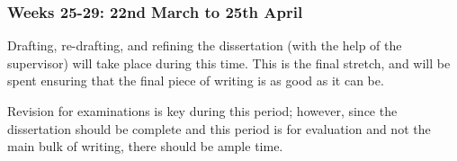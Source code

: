 \documentclass[12pt, a4paper]{scrartcl}
\begin{document}
\subsubsection{Weeks 25-29: 22nd March to 25th April}

Drafting, re-drafting, and refining the dissertation (with the help of the supervisor) will take place during this time. This is the final stretch, and will be spent ensuring that the final piece of writing is as good as it can be.

Revision for examinations is key during this period; however, since the dissertation should be complete and this period is for evaluation and not the main bulk of writing, there should be ample time.




\end{document}
